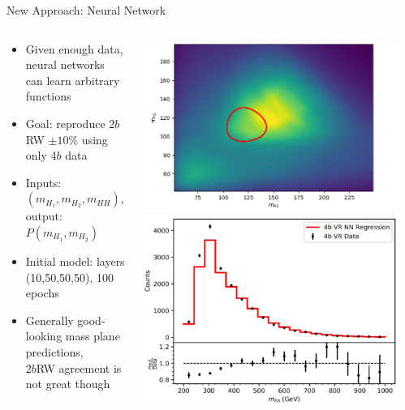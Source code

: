 \documentclass[10pt, aspectratio=169]{beamer}
\begin{document}
{
\begin{frame}{New Approach: Neural Network}
  \begin{columns}[onlytextwidth]
    \begin{column}{0.6\textwidth}
      \begin{itemize}
        \item Given enough data, neural networks can learn arbitrary functions
        \item Goal: reproduce 2$b$RW $\pm 10\%$ using only 4$b$ data
        \item Inputs: $(m_{H_1}, m_{H_2}, m_{HH})$, output: $P(m_{H_1}, m_{H_2})$
        \item Initial model: layers (10,50,50,50), 100 epochs
        \item Generally good-looking mass plane predictions,\\
              2$b$RW agreement is not great though
      \end{itemize}
    \end{column}
    \begin{column}{0.4\textwidth}
      \includegraphics[width=\linewidth]{images/todd_nn_massplane.png}\\
      \includegraphics[width=\linewidth]{images/todd_nn_hist.png}\\
    \end{column}
​  \end{columns}
\end{frame}
}
\end{document}
